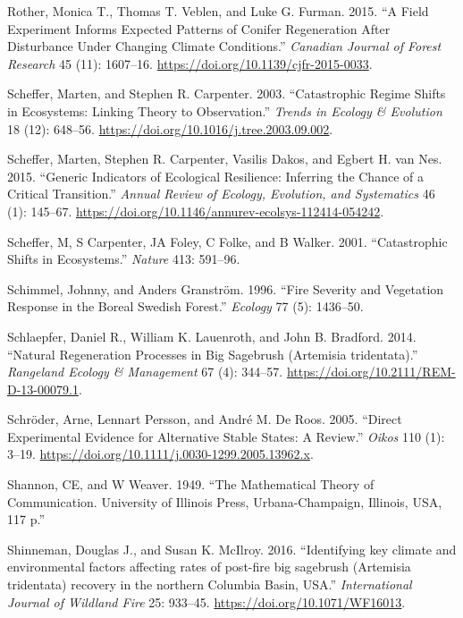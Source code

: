 \documentclass[
  12pt,
]{article}
\newlength{\cslhangindent}
\newlength{\cslentryspacingunit} %
\newenvironment{CSLReferences}[2] %
 {%
  \setlength{\parindent}{0pt}
  \ifodd #1
  \let\oldpar\par
  \def\par{\hangindent=\cslhangindent\oldpar}
  \fi
  \setlength{\parskip}{#2\cslentryspacingunit}
 }%
 {}
\begin{document}
\begin{CSLReferences}{1}{0}
\leavevmode{}%
Rother, Monica T., Thomas T. Veblen, and Luke G. Furman. 2015. {``A
Field Experiment Informs Expected Patterns of Conifer Regeneration After
Disturbance Under Changing Climate Conditions.''} \emph{Canadian Journal
of Forest Research} 45 (11): 1607--16.
\url{https://doi.org/10.1139/cjfr-2015-0033}.

\leavevmode{}%
Scheffer, Marten, and Stephen R. Carpenter. 2003. {``Catastrophic Regime
Shifts in Ecosystems: Linking Theory to Observation.''} \emph{Trends in
Ecology \& Evolution} 18 (12): 648--56.
\url{https://doi.org/10.1016/j.tree.2003.09.002}.

\leavevmode{}%
Scheffer, Marten, Stephen R. Carpenter, Vasilis Dakos, and Egbert H. van
Nes. 2015. {``Generic {Indicators} of {Ecological} {Resilience}:
{Inferring} the {Chance} of a {Critical} {Transition}.''} \emph{Annual
Review of Ecology, Evolution, and Systematics} 46 (1): 145--67.
\url{https://doi.org/10.1146/annurev-ecolsys-112414-054242}.

\leavevmode{}%
Scheffer, M, S Carpenter, JA Foley, C Folke, and B Walker. 2001.
{``Catastrophic Shifts in Ecosystems.''} \emph{Nature} 413: 591--96.

\leavevmode{}%
Schimmel, Johnny, and Anders Granström. 1996. {``{Fire Severity and
Vegetation Response in the Boreal Swedish Forest}.''} \emph{Ecology} 77
(5): 1436--50.

\leavevmode{}%
Schlaepfer, Daniel R., William K. Lauenroth, and John B. Bradford. 2014.
{``{Natural Regeneration Processes in Big Sagebrush (Artemisia
tridentata)}.''} \emph{Rangeland Ecology \& Management} 67 (4): 344--57.
\url{https://doi.org/10.2111/REM-D-13-00079.1}.

\leavevmode{}%
Schröder, Arne, Lennart Persson, and André M. De Roos. 2005. {``Direct
Experimental Evidence for Alternative Stable States: {A} Review.''}
\emph{Oikos} 110 (1): 3--19.
\url{https://doi.org/10.1111/j.0030-1299.2005.13962.x}.

\leavevmode{}%
Shannon, CE, and W Weaver. 1949. {``The Mathematical Theory of
Communication. University of Illinois Press, Urbana-Champaign, Illinois,
USA, 117 p.''}

\leavevmode{}%
Shinneman, Douglas J., and Susan K. McIlroy. 2016. {``{Identifying key
climate and environmental factors affecting rates of post-fire big
sagebrush (Artemisia tridentata) recovery in the northern Columbia
Basin, USA}.''} \emph{International Journal of Wildland Fire} 25:
933--45. \url{https://doi.org/10.1071/WF16013}.


\end{CSLReferences}
\end{document}

